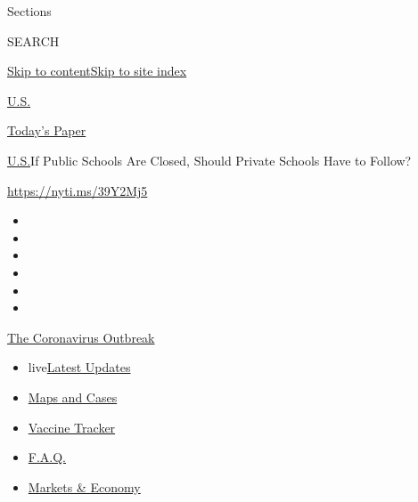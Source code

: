 Sections

SEARCH

\protect\hyperlink{site-content}{Skip to
content}\protect\hyperlink{site-index}{Skip to site index}

\href{https://www.nytimes.com/section/us}{U.S.}

\href{https://myaccount.nytimes.com/auth/login?response_type=cookie\&client_id=vi}{}

\href{https://www.nytimes.com/section/todayspaper}{Today's Paper}

\href{/section/us}{U.S.}\textbar{}If Public Schools Are Closed, Should
Private Schools Have to Follow?

\href{https://nyti.ms/39Y2Mj5}{https://nyti.ms/39Y2Mj5}

\begin{itemize}
\item
\item
\item
\item
\item
\item
\end{itemize}

\href{https://www.nytimes.com/news-event/coronavirus?action=click\&pgtype=Article\&state=default\&region=TOP_BANNER\&context=storylines_menu}{The
Coronavirus Outbreak}

\begin{itemize}
\tightlist
\item
  live\href{https://www.nytimes.com/2020/08/08/world/coronavirus-updates.html?action=click\&pgtype=Article\&state=default\&region=TOP_BANNER\&context=storylines_menu}{Latest
  Updates}
\item
  \href{https://www.nytimes.com/interactive/2020/us/coronavirus-us-cases.html?action=click\&pgtype=Article\&state=default\&region=TOP_BANNER\&context=storylines_menu}{Maps
  and Cases}
\item
  \href{https://www.nytimes.com/interactive/2020/science/coronavirus-vaccine-tracker.html?action=click\&pgtype=Article\&state=default\&region=TOP_BANNER\&context=storylines_menu}{Vaccine
  Tracker}
\item
  \href{https://www.nytimes.com/interactive/2020/world/coronavirus-tips-advice.html?action=click\&pgtype=Article\&state=default\&region=TOP_BANNER\&context=storylines_menu}{F.A.Q.}
\item
  \href{https://www.nytimes.com/live/2020/08/07/business/stock-market-today-coronavirus?action=click\&pgtype=Article\&state=default\&region=TOP_BANNER\&context=storylines_menu}{Markets
  \& Economy}
\end{itemize}

